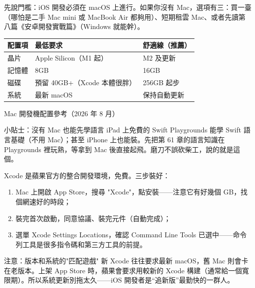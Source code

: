 


先說門檻：iOS 開發必須在 macOS 上進行。如果你沒有 Mac，選項有三：買一臺（哪怕是二手 Mac mini 或 MacBook Air 都夠用）、短期租雲 Mac、或者先讀第八篇《安卓開發實戰篇》（Windows 就能幹）。

\begin{center}
\begin{tabularx}{\linewidth}{|X|X|X|}
\hline
\textbf{配置項} & \textbf{最低要求} & \textbf{舒適線（推薦）} \tabularnewline
\hline
晶片 & Apple Silicon（M1 起） & M2 及更新 \tabularnewline
記憶體 & 8GB & 16GB \tabularnewline
磁碟 & 預留 40GB+（Xcode 本體很胖） & 256GB 起步 \tabularnewline
系統 & 最新 macOS & 保持自動更新 \tabularnewline
\hline
\end{tabularx}
\end{center}

\begin{center}\small\color{gray}Mac 開發機配置參考（2026 年 8 月）\end{center}

\begin{tcbinfo}{小貼士：沒有 Mac 也能先學語言}
iPad 上免費的 Swift Playgrounds 能學 Swift 語言基礎（不用 Mac）；甚至 iPhone 上也能裝。先把第 61 章的語言知識在 Playgrounds 裡玩熟，等拿到 Mac 後直接起飛。磨刀不誤砍柴工，說的就是這個。

\end{tcbinfo}


Xcode 是蘋果官方的整合開發環境，免費。三步裝好：

\begin{enumerate}
  \item Mac 上開啟 App Store，搜尋 "Xcode"，點安裝——注意它有好幾個 GB，找個網速好的時段；
  \item 裝完首次啟動，同意協議、裝完元件（自動完成）；
  \item 選單 Xcode Settings Locations，確認 Command Line Tools 已選中——命令列工具是很多指令碼和第三方工具的前提。
\end{enumerate}

\begin{tcbwarn}{注意：版本和系統的"匹配遊戲"}
新 Xcode 往往要求最新 macOS，舊 Mac 則會卡在老版本。上架 App Store 時，蘋果會要求用較新的 Xcode 構建（通常給一個寬限期）。所以系統更新別拖太久——iOS 開發者是“追新版”最勤快的一群人。

\end{tcbwarn}

